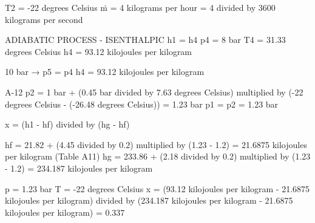 T2 = -22 degrees Celsius  
ṁ = 4 kilograms per hour = 4 divided by 3600 kilograms per second  

ADIABATIC PROCESS - ISENTHALPIC  
h1 = h4  
p4 = 8 bar  
T4 = 31.33 degrees Celsius  
h4 = 93.12 kilojoules per kilogram  

10 bar → p5 = p4  
h4 = 93.12 kilojoules per kilogram  

A-12  
p2 = 1 bar + (0.45 bar divided by 7.63 degrees Celsius) multiplied by (-22 degrees Celsius - (-26.48 degrees Celsius))  
= 1.23 bar  
p1 = p2 = 1.23 bar  

x = (h1 - hf) divided by (hg - hf)  

hf = 21.82 + (4.45 divided by 0.2) multiplied by (1.23 - 1.2) = 21.6875 kilojoules per kilogram (Table A11)  
hg = 233.86 + (2.18 divided by 0.2) multiplied by (1.23 - 1.2) = 234.187 kilojoules per kilogram  

p = 1.23 bar  
T = -22 degrees Celsius  
x = (93.12 kilojoules per kilogram - 21.6875 kilojoules per kilogram) divided by (234.187 kilojoules per kilogram - 21.6875 kilojoules per kilogram) = 0.337